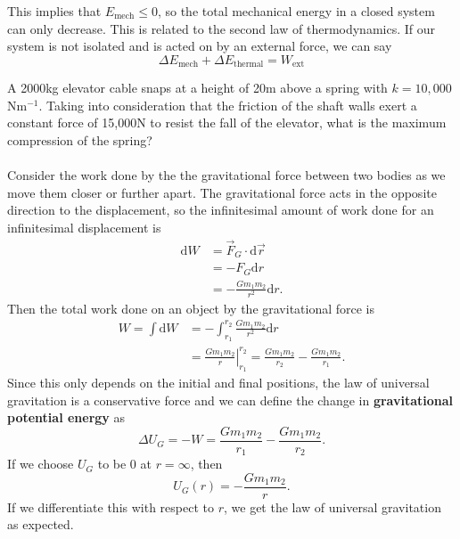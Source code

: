 \documentclass[../newtonian_mechanics.tex]{subfiles}
\begin{document}
        This implies that $E_\text{mech}\leq 0$, so the total mechanical energy in a closed system can only decrease.
        This is related to the second law of thermodynamics.
        If our system is not isolated and is acted on by an external force, we can say
        \begin{equation}
            \Delta E_\text{mech} + \Delta E_\text{thermal} = W_\text{ext}
        \end{equation}
        \begin{example}
            A 2000kg elevator cable snaps at a height of 20m above a spring with $k=10,000$Nm$^{-1}$.
            Taking into consideration that the friction of the shaft walls exert a constant force of 15,000N to resist the fall of the elevator, what is the maximum compression of the spring?
        \end{example}

        \paragraph{}
        Consider the work done by the the gravitational force between two bodies as we move them closer or further apart.
        The gravitational force acts in the opposite direction to the displacement, so the infinitesimal amount of work done for an infinitesimal displacement is
        \begin{align}
            \mathrm{d}W&=\vec{F}_G\cdot\mathrm{d}\vec{r}\\
            &=-F_G\mathrm{d}r\\
            &=-\frac{Gm_1m_2}{r^2}\mathrm{d}r.
        \end{align}
        Then the total work done on an object by the gravitational force is
        \begin{align}
            W=\int\mathrm{d}W&=-\int_{r_1}^{r_2}\frac{Gm_1m_2}{r^2}\mathrm{d}r\\
            &=\left.\frac{Gm_1m_2}{r}\right|_{r_1}^{r_2}=\frac{Gm_1m_2}{r_2}-\frac{Gm_1m_2}{r_1}.
        \end{align}
        Since this only depends on the initial and final positions, the law of universal gravitation is a conservative force and we can define the change in \textbf{gravitational potential energy} as
        \begin{equation}
            \Delta U_G=-W=\frac{Gm_1m_2}{r_1}-\frac{Gm_1m_2}{r_2}.
        \end{equation}
        If we choose $U_G$ to be 0 at $r=\infty$, then
        \begin{equation}
            U_G(r)=-\frac{Gm_1m_2}{r}.
        \end{equation}
        If we differentiate this with respect to $r$, we get the law of universal gravitation as expected.
\end{document}
